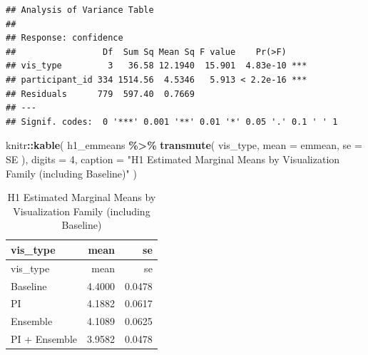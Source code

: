 \documentclass[
]{article}
\newenvironment{Shaded}{\begin{snugshade}}{\end{snugshade}}
\newcommand{\AttributeTok}[1]{\textcolor[rgb]{0.13,0.29,0.53}{#1}}
\newcommand{\DecValTok}[1]{\textcolor[rgb]{0.00,0.00,0.81}{#1}}
\newcommand{\FunctionTok}[1]{\textcolor[rgb]{0.13,0.29,0.53}{\textbf{#1}}}
\newcommand{\NormalTok}[1]{#1}
\newcommand{\SpecialCharTok}[1]{\textcolor[rgb]{0.81,0.36,0.00}{\textbf{#1}}}
\newcommand{\StringTok}[1]{\textcolor[rgb]{0.31,0.60,0.02}{#1}}
\begin{document}
\begin{verbatim}
## Analysis of Variance Table
## 
## Response: confidence
##                 Df  Sum Sq Mean Sq F value    Pr(>F)    
## vis_type         3   36.58 12.1940  15.901  4.83e-10 ***
## participant_id 334 1514.56  4.5346   5.913 < 2.2e-16 ***
## Residuals      779  597.40  0.7669                      
## ---
## Signif. codes:  0 '***' 0.001 '**' 0.01 '*' 0.05 '.' 0.1 ' ' 1
\end{verbatim}

\begin{Shaded}
\begin{Highlighting}[]
\NormalTok{knitr}\SpecialCharTok{::}\FunctionTok{kable}\NormalTok{(}
\NormalTok{  h1\_emmeans }\SpecialCharTok{\%\textgreater{}\%}
    \FunctionTok{transmute}\NormalTok{(}
\NormalTok{      vis\_type,}
      \AttributeTok{mean =}\NormalTok{ emmean,}
      \AttributeTok{se =}\NormalTok{ SE}
\NormalTok{    ),}
  \AttributeTok{digits =} \DecValTok{4}\NormalTok{,}
  \AttributeTok{caption =} \StringTok{"H1 Estimated Marginal Means by Visualization Family (including Baseline)"}
\NormalTok{)}
\end{Highlighting}
\end{Shaded}

\begin{longtable}[]{@{}lrr@{}}
\caption{H1 Estimated Marginal Means by Visualization Family (including
Baseline)}\tabularnewline
\toprule\noalign{}
vis\_type & mean & se \\
\midrule\noalign{}
\endfirsthead
\toprule\noalign{}
vis\_type & mean & se \\
\midrule\noalign{}
\endhead
\bottomrule\noalign{}
\endlastfoot
Baseline & 4.4000 & 0.0478 \\
PI & 4.1882 & 0.0617 \\
Ensemble & 4.1089 & 0.0625 \\
PI + Ensemble & 3.9582 & 0.0478 \\
\end{longtable}
\end{document}
